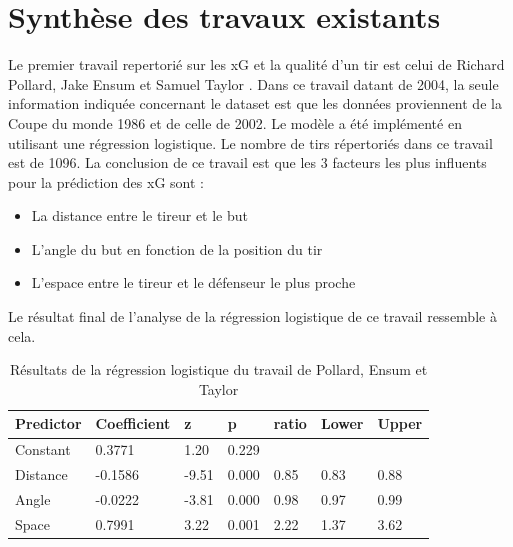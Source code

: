 \documentclass[12pt]{article}
\begin{document}
\newpage
\section{Synthèse des travaux existants}
\label{sec:synthese}
Le premier travail repertorié sur les xG et la qualité d'un tir est celui de Richard Pollard, Jake Ensum et Samuel Taylor \cite{pollardEstimatingProbabilityShot2004}.
Dans ce travail datant de 2004, la seule information indiquée concernant le dataset est que les données proviennent de la Coupe du monde 1986 et de celle de 2002.
Le modèle a été implémenté en utilisant une régression logistique.
Le nombre de tirs répertoriés dans ce travail est de 1096.
La conclusion de ce travail est que les 3 facteurs les plus influents pour la prédiction des xG sont :
\begin{itemize}
    \item La distance entre le tireur et le but
    \item L'angle du but en fonction de la position du tir
    \item L'espace entre le tireur et le défenseur le plus proche
\end{itemize}
Le résultat final de l'analyse de la régression logistique de ce travail ressemble à cela.
\begin{table}[htp]
    \centering
    \begin{tabular}{|l|l|l|l|l|l|l|}
        \hline
        \textbf{Predictor} & \textbf{Coefficient} & \textbf{z} & \textbf{p} & \textbf{ratio} & \textbf{Lower} & \textbf{Upper} \\ \hline
        Constant           & 0.3771               & 1.20       & 0.229      &                &                &                \\ \hline
        Distance           & -0.1586              & -9.51      & 0.000      & 0.85           & 0.83           & 0.88           \\ \hline
        Angle              & -0.0222              & -3.81      & 0.000      & 0.98           & 0.97           & 0.99           \\ \hline
        Space              & 0.7991               & 3.22       & 0.001      & 2.22           & 1.37           & 3.62           \\ \hline
    \end{tabular}
    \caption{Résultats de la régression logistique du travail de Pollard, Ensum et Taylor}
\end{table}
\end{document}
